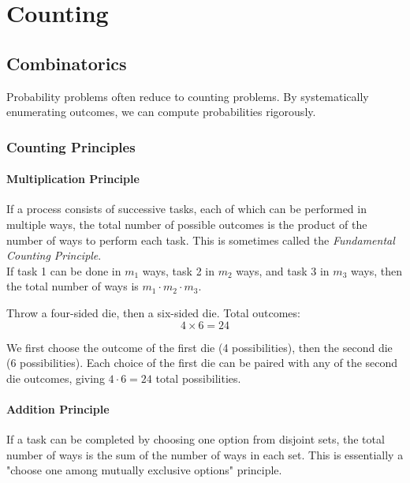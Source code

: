 \chapter{Counting}

\section{Combinatorics}

Probability problems often reduce to counting problems. By systematically enumerating outcomes, we can compute probabilities rigorously.

\subsection{Counting Principles}

\subsubsection{Multiplication Principle} 

\begin{explanation}
If a process consists of successive tasks, each of which can be performed in multiple ways, the total number of possible outcomes is the product of the number of ways to perform each task. This is sometimes called the \emph{Fundamental Counting Principle}.
\\
If task 1 can be done in $m_1$ ways, task 2 in $m_2$ ways, and task 3 in $m_3$ ways, then the total number of ways is $m_1 \cdot m_2 \cdot m_3$.
\end{explanation}


\begin{eg}
Throw a four-sided die, then a six-sided die. Total outcomes:
\[
4 \times 6 = 24
\]

\begin{explanation}
We first choose the outcome of the first die (4 possibilities), then the second die (6 possibilities). Each choice of the first die can be paired with any of the second die outcomes, giving $4 \cdot 6 = 24$ total possibilities.
\end{explanation}
\end{eg}

\subsubsection{Addition Principle} 
\begin{explanation}
If a task can be completed by choosing one option from disjoint sets, the total number of ways is the sum of the number of ways in each set. This is essentially a "choose one among mutually exclusive options" principle.
\end{explanation}

